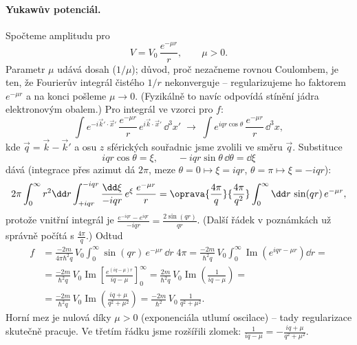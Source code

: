 \paragraph{Yukawův potenciál.}
Spočteme amplitudu pro 
\begin{equation}
  V = V_0\,\frac{e^{-\mu r}}{r},\qquad \mu>0 .
\end{equation}
Parametr $\mu$ udává dosah ($1/\mu$); důvod, proč nezačneme rovnou Coulombem, je ten, že Fourierův integrál čistého $1/r$ nekonverguje -- regularizujeme ho faktorem $e^{-\mu r}$ a na konci pošleme $\mu\to0$. (Fyzikálně to navíc odpovídá stínění jádra elektronovým obalem.) Pro integrál ve vzorci pro $f$:
\begin{equation}
  \int e^{-i\vec k'\cdot\vec x'}\,\frac{e^{-\mu r}}{r}\,e^{i\vec k\cdot\vec x'}\,\dd^3x' \;\longrightarrow\; \int e^{iqr\cos\theta}\,\frac{e^{-\mu r}}{r}\,\dd^3x,
\end{equation}
kde $\vec q = \vec k - \vec k'$  a osu $z$ sférických souřadnic jsme zvolili ve směru $\vec q$. Substituce
\[
  iqr\cos\theta = \xi,\qquad -iqr\sin\theta\,\dd\theta = \dd\xi
\]
dává (integrace přes azimut dá $2\pi$, meze $\theta=0\mapsto\xi=iqr$, $\theta=\pi\mapsto\xi=-iqr$):
\begin{equation}
  2\pi\int_0^\infty r^2\dd r\int_{+iqr}^{-iqr}\frac{\dd\xi}{-iqr}\,e^{\xi}\,\frac{e^{-\mu r}}{r}
  = \oprava{\frac{4\pi}{q}}{\frac{4\pi}{q^2}}\int_0^\infty \dd r\,\sin(qr)\,e^{-\mu r},
\end{equation}
protože vnitřní integrál je $\frac{e^{-iqr}-e^{iqr}}{-iqr} = \frac{2\sin(qr)}{qr}$. (Další řádek v poznámkách už správně počítá s $\frac{4\pi}{q}$.) Odtud
\begin{align}
  f &= \frac{-2m}{4\pi\hbar^2 q}\,V_0\int_0^\infty\sin(qr)\,e^{-\mu r}\,\dd r\;4\pi
     = \frac{-2m}{\hbar^2 q}\,V_0\int_0^\infty \operatorname{Im}\left(e^{iqr-\mu r}\right)\dd r = \\
    &= \frac{-2m}{\hbar^2 q}\,V_0\operatorname{Im}\left[\frac{e^{(iq-\mu)r}}{iq-\mu}\right]_0^\infty
     = \frac{2m}{\hbar^2 q}\,V_0\operatorname{Im}\left(\frac{1}{iq-\mu}\right) = \\
    &= \frac{-2m}{\hbar^2 q}\,V_0\operatorname{Im}\left(\frac{iq+\mu}{q^2+\mu^2}\right)
     = \frac{-2m}{\hbar^2}\,V_0\,\frac{1}{q^2+\mu^2}.
\end{align}
Horní mez je nulová díky $\mu>0$ (exponenciála utlumí oscilace) -- tady regularizace skutečně pracuje. Ve třetím řádku jsme rozšířili zlomek: $\frac{1}{iq-\mu} = -\frac{iq+\mu}{q^2+\mu^2}$.

